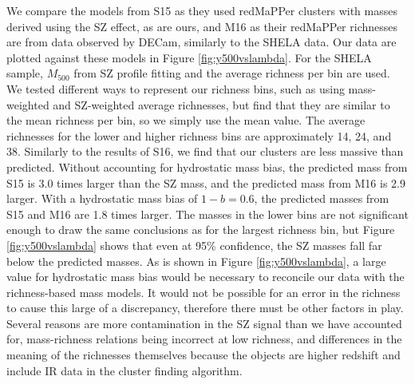 \documentclass[a4paper,fleqn,usenatbib]{mnras}
\begin{document}
We compare the models from S15 as they used redMaPPer clusters with masses derived using the SZ effect, as are ours, and M16 as their redMaPPer richnesses are from data observed by DECam, similarly to the SHELA data. Our data are plotted against these models in Figure \ref{fig:y500vslambda}. For the SHELA sample, $M_{500}$ from SZ profile fitting and the average richness per bin are used. We tested different ways to represent our richness bins, such as using mass-weighted and SZ-weighted average richnesses, but find that they are similar to the mean richness per bin, so we simply use the mean value. The average richnesses for the lower and higher richness bins are approximately 14, 24, and 38. Similarly to the results of S16, we find that our clusters are less massive than predicted. 
Without accounting for hydrostatic mass bias, the predicted mass from S15 is 3.0 times larger than the SZ mass, and the predicted mass from M16 is 2.9 larger. With a hydrostatic mass bias of $1-b = 0.6$, the predicted masses from S15 and M16 are 1.8 times larger. The masses in the lower bins are not significant enough to draw the same conclusions as for the largest richness bin, but Figure \ref{fig:y500vslambda} shows that even at 95\% confidence, the SZ masses fall far below the predicted masses. 
As is shown in Figure \ref{fig:y500vslambda}, a large value for hydrostatic mass bias would be necessary to reconcile our data with the richness-based mass models. It would not be possible for an error in the richness to cause this large of a discrepancy, therefore there must be other factors in play. Several reasons are more contamination in the SZ signal than we have accounted for, mass-richness relations being incorrect at low richness, and differences in the meaning of the richnesses themselves because the objects are higher redshift and include IR data in the cluster finding algorithm.


\end{document}

